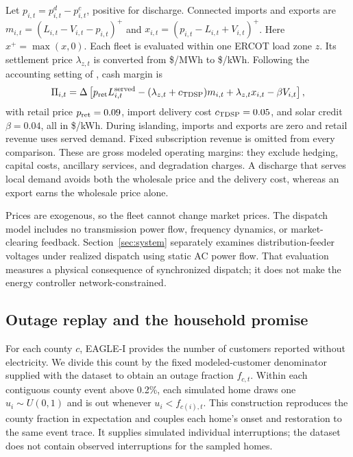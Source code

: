 Let $p_{i,t}=p^d_{i,t}-p^c_{i,t}$, positive for discharge. Connected imports and exports are $m_{i,t}=(L_{i,t}-V_{i,t}-p_{i,t})^+$ and $x_{i,t}=(p_{i,t}-L_{i,t}+V_{i,t})^+$. Here $x^+=\max(x,0)$. Each fleet is evaluated within one ERCOT load zone $z$. Its settlement price $\lambda_{z,t}$ is converted from \$/MWh to \$/kWh. Following the accounting setting of \citet{anunrojwong2026pooling}, cash margin is
\begin{equation}
 \Pi_{i,t}=\Delta\left[p_{\rm ret}L^{\rm served}_{i,t}-(\lambda_{z,t}+c_{\rm TDSP})m_{i,t}+\lambda_{z,t}x_{i,t}-\beta V_{i,t}\right],
 \label{eq:margin}
\end{equation}
with retail price $p_{\rm ret}=0.09$, import delivery cost $c_{\rm TDSP}=0.05$, and solar credit $\beta=0.04$, all in \$/kWh. During islanding, imports and exports are zero and retail revenue uses served demand. Fixed subscription revenue is omitted from every comparison. These are gross modeled operating margins: they exclude hedging, capital costs, ancillary services, and degradation charges. A discharge that serves local demand avoids both the wholesale price and the delivery cost, whereas an export earns the wholesale price alone.

Prices are exogenous, so the fleet cannot change market prices. The dispatch model includes no transmission power flow, frequency dynamics, or market-clearing feedback. Section~\ref{sec:system} separately examines distribution-feeder voltages under realized dispatch using static AC power flow. That evaluation measures a physical consequence of synchronized dispatch; it does not make the energy controller network-constrained.

\subsection{Outage replay and the household promise}

For each county $c$, EAGLE-I provides the number of customers reported without electricity. We divide this count by the fixed modeled-customer denominator supplied with the dataset to obtain an outage fraction $f_{c,t}$. Within each contiguous county event above 0.2\%, each simulated home draws one $u_i\sim U(0,1)$ and is out whenever $u_i<f_{c(i),t}$. This construction reproduces the county fraction in expectation and couples each home's onset and restoration to the same event trace. It supplies simulated individual interruptions; the dataset does not contain observed interruptions for the sampled homes.

